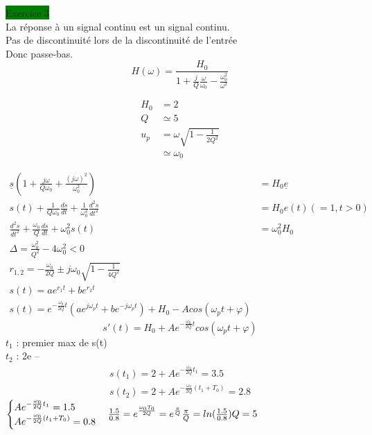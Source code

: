 \documentclass[a4paper,twocolumn,landscape]{article}
\begin{document}
\noindent
\colorbox{green}{Exercice 3}\\
La réponse à un signal continu est un signal continu.\\
Pas de discontinuité lors de la discontinuité de l'entrée\\
Donc passe-bas. \\
\begin{equation*}
    H(\omega) = \frac{H_0}{1+\frac{j}{Q}\frac{\omega}{\omega_0}-\frac{\omega_0^2}{\omega^2}}
\end{equation*} 

\begin{align*}
    H_0 &= 2\\
    Q &\simeq 5 \\
    u_p &= \omega\sqrt{1-\frac{1}{2Q^2}}\\
    &\simeq \omega_0 
\end{align*}

\begin{align*}
    \underline{s} (1 + \frac{j\omega}{Q\omega_0} + \frac{(j\omega)^2}{\omega_0^2}) &= H_0 \underline{e}\\
    s(t) + \frac{1}{Q\omega_0}\frac{ds}{dt} + \frac{1}{\omega_0^2}\frac{d^2s}{dt^2} &= H_0e(t) (= 1, t > 0)\\
    \frac{d^2s}{dt^2} + \frac{\omega_0}{Q}\frac{ds}{dt} + \omega_0^2 s(t) &= \omega_0^2H_0\\
    \Delta = \frac{\omega_0^2}{Q^2} - 4\omega_0^2<0\\
    r_{1,2} = -\frac{\omega_0}{2Q} \pm j\omega_0 \sqrt{1-\frac{1}{4Q^2}}\\
    s(t) = ae^{r_1t} + be^{r_2 t}\\
    s(t) = e^{-\frac{\omega_0}{2Q}t}(ae^{j\omega_pt} + be^{-j\omega_pt}) + H_0 - Acos(\omega_p t + \varphi)
\end{align*}
\begin{equation*}
    s'(t) = H_0 + Ae^{-\frac{\omega_0}{2Q}t} cos(\omega_p t + \varphi)
\end{equation*}
\(t_1\) : premier max de s(t)\\
\(t_2\) : 2e --\\
\begin{align*}
    s(t_1) = 2 + Ae^{-\frac{\omega_0}{2Q}t_1} = 3.5\\
    s(t_2) =2 + Ae^{-\frac{\omega_0}{2Q}(t_1 + T_0)} = 2.8
\end{align*}
\begin{math}
    \begin{cases}
        Ae^{-\frac{\omega_0}{2Q}t_1} = 1.5\\
        Ae^{-\frac{\omega_0}{2Q}(t_1+T_0)} = 0.8
    \end{cases}\\
    \frac{1.5}{0.8} = e^{\frac{\omega_0 T_0}{2Q}} = e^{\frac{\pi}{Q}}\\
    \frac{\pi}{Q} = ln(\frac{1.5}{0.8})\\
    Q = 5
\end{math}
\end{document}
